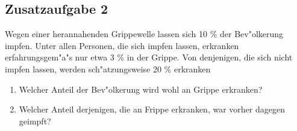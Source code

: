 \subsection*{Zusatzaufgabe 2}

Wegen einer herannahenden Grippewelle lassen sich 10 \% der Bev"olkerung impfen. Unter allen Personen, die sich impfen lassen, erkranken erfahrungsgem"a"s nur etwa 3 \% in der Grippe. Von denjenigen, die sich nicht impfen lassen, werden sch"atzungsweise 20 \% erkranken

\begin{enumerate} [label=\alph*)]
\item Welcher Anteil der Bev"olkerung wird wohl an Grippe erkranken?
\vspace{6cm}
\item Welcher Anteil derjenigen, die an Frippe erkranken, war vorher dagegen geimpft?
\end{enumerate}
